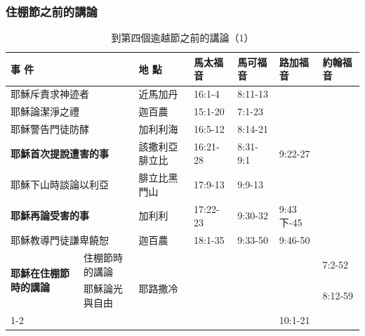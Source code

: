 \subsubsection{住棚節之前的講論}
\begin{table}[htbp]
  \centering
    \begin{tabular}{|p{5.855em}l|l|l|l|l|p{4.07em}|}
    \toprule
    \multicolumn{2}{|p{12.71em}|}{事 件} & \multicolumn{1}{p{7.93em}|}{地 點} & \multicolumn{1}{p{4.0em}|}{馬太福音} & \multicolumn{1}{p{4.0em}|}{馬可福音} &  \multicolumn{1}{p{4.em}|}{路加福音} & 約翰福音 \\
    \midrule
    \multicolumn{2}{|p{12.71em}|}{耶穌斥責求神迹者} & 近馬加丹 & 16:1-4 & 8:11-13 &       &  \\
    \midrule
    \multicolumn{2}{|p{12.71em}|}{耶穌論潔淨之禮} & \multicolumn{1}{p{4.93em}|}{迦百農} & 15:1-20 & 7:1-23 &       &  \\
    \midrule
    \multicolumn{2}{|p{12.71em}|}{耶穌警告門徒防酵} & \multicolumn{1}{p{4.93em}|}{加利利海} & 16:5-12 & 8:14-21 &       &  \\
    \midrule
    \multicolumn{2}{|p{12.71em}|}{\textbf{耶穌首次提說遭害的事}} & \multicolumn{1}{p{7.93em}|}{該撒利亞腓立比} & 16:21-28 &8:31-9:1 & 9:22-27 & \\
    \midrule
    \multicolumn{2}{|p{12.71em}|}{耶穌下山時談論以利亞} & \multicolumn{1}{p{7.93em}|}{腓立比黑門山} & 17:9-13 & 9:9-13 &       &  \\
    \midrule
    \multicolumn{2}{|p{12.71em}|}{\textbf{耶穌再論受害的事}} & \multicolumn{1}{p{4.93em}|}{加利利} & 17:22-23 &9:30-32 &9:43下-45 &  \\
    \midrule
    \multicolumn{2}{|p{12.71em}|}{耶穌教導門徒謙卑饒恕} & \multicolumn{1}{p{4.93em}|}{迦百農} & 18:1-35 & 9:33-50 & 9:46-50 &  \\
    \midrule
    \multicolumn{1}{|l|}{\multirow{2}{*}{\parbox{0.098\textwidth}{\textbf{耶穌在住棚節時的講論}}}} & \multicolumn{1}{p{7.855em}|}{住棚節時的講論} & \multicolumn{1}{l|}{\multirow{3}{*}{耶路撒冷}} &       &       &       & 7:2-52 \\
\cmidrule{2-2}\cmidrule{4-7}    \multicolumn{1}{|c|}{} & \multicolumn{1}{p{7.855em}|}{耶穌論光與自由} &       &       &       &       & 8:12-59 \\
\cmidrule{1-2}\cmidrule{4-7}    \multicolumn{2}{|p{10.71em}|}{耶穌論好牧人（修殿節）} &       &       &       &       & 10:1-21 \\
    \bottomrule
    \end{tabular}%
     \caption{到第四個逾越節之前的講論（1）}
  \label{tab:addlabel}%
\end{table}%


